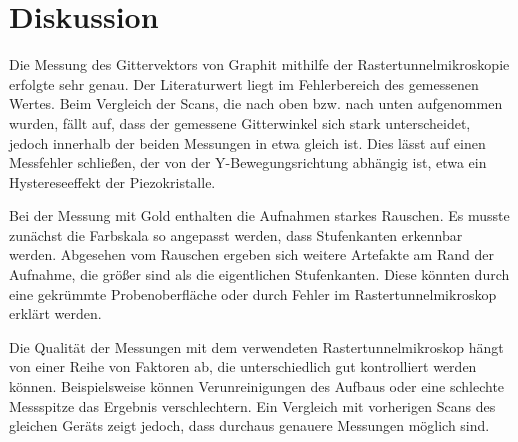 \section{Diskussion}

Die Messung des Gittervektors von Graphit mithilfe der Rastertunnelmikroskopie erfolgte sehr genau.
Der Literaturwert liegt im Fehlerbereich des gemessenen Wertes.
Beim Vergleich der Scans, die nach oben bzw. nach unten aufgenommen wurden, fällt auf, dass der gemessene Gitterwinkel sich stark unterscheidet, jedoch innerhalb der beiden Messungen in etwa gleich ist.
Dies lässt auf einen Messfehler schließen, der von der Y-Bewegungsrichtung abhängig ist, etwa ein Hystereseeffekt der Piezokristalle.

Bei der Messung mit Gold enthalten die Aufnahmen starkes Rauschen.
Es musste zunächst die Farbskala so angepasst werden, dass Stufenkanten erkennbar werden.
Abgesehen vom Rauschen ergeben sich weitere Artefakte am Rand der Aufnahme, die größer sind als die eigentlichen Stufenkanten.
Diese könnten durch eine gekrümmte Probenoberfläche oder durch Fehler im Rastertunnelmikroskop erklärt werden.

Die Qualität der Messungen mit dem verwendeten Rastertunnelmikroskop hängt von einer Reihe von Faktoren ab, die unterschiedlich gut kontrolliert werden können.
Beispielsweise können Verunreinigungen des Aufbaus oder eine schlechte Messspitze das Ergebnis verschlechtern.
Ein Vergleich mit vorherigen Scans des gleichen Geräts zeigt jedoch, dass durchaus genauere Messungen möglich sind.